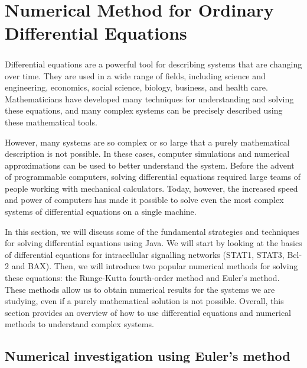 \chapter{Numerical Method for Ordinary Differential Equations}
\label{chap:04}

\paragraph{}


Differential equations are a powerful tool for describing systems that are changing over time. They are used in a wide range of fields, including science and engineering, economics, social science, biology, business, and health care. Mathematicians have developed many techniques for understanding and solving these equations, and many complex systems can be precisely described using these mathematical tools.

However, many systems are so complex or so large that a purely mathematical description is not possible. In these cases, computer simulations and numerical approximations can be used to better understand the system. Before the advent of programmable computers, solving differential equations required large teams of people working with mechanical calculators. Today, however, the increased speed and power of computers has made it possible to solve even the most complex systems of differential equations on a single machine. 

In this section, we will discuss some of the fundamental strategies and techniques for solving differential equations using Java. We will start by looking at the basics of differential equations for intracellular signalling networks (STAT1, STAT3, Bcl-2 and
BAX). Then, we will introduce two popular numerical methods for solving these equations: the Runge-Kutta fourth-order method and Euler's method. These methods allow us to obtain numerical results for the systems we are studying, even if a purely mathematical solution is not possible. Overall, this section provides an overview of how to use differential equations and numerical methods to understand complex systems. 



\section{Numerical investigation using Euler's method}
\label{sec:4.1}
\paragraph{}

